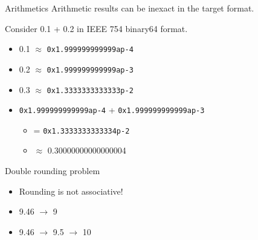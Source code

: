\documentclass{beamer}
\begin{document}

\begin{frame}{Arithmetics}
    Arithmetic results can be inexact in the target format.
    
    \begin{example}
        Consider 0.1 + 0.2 in IEEE 754 binary64 format.

        \begin{itemize}
            \item 0.1 $\approx$ \texttt{0x1.999999999999ap-4}
            \item 0.2 $\approx$ \texttt{0x1.999999999999ap-3}
            \item 0.3 $\approx$ \texttt{0x1.3333333333333p-2}
            \item \texttt{0x1.999999999999ap-4} + \texttt{0x1.999999999999ap-3}
                \begin{itemize}
                    \item[] = \texttt{0x1.3333333333334p-2}
                    \item[] $\approx$ 0.30000000000000004
                \end{itemize}
        \end{itemize}
    \end{example}
\end{frame}

\begin{frame}{Double rounding problem}
    \begin{itemize}
        \item Rounding is not associative!
        \item 9.46 $\to$ 9
        \item 9.46 $\to$ 9.5 $\to$ 10
    \end{itemize}
\end{frame}
\end{document}
